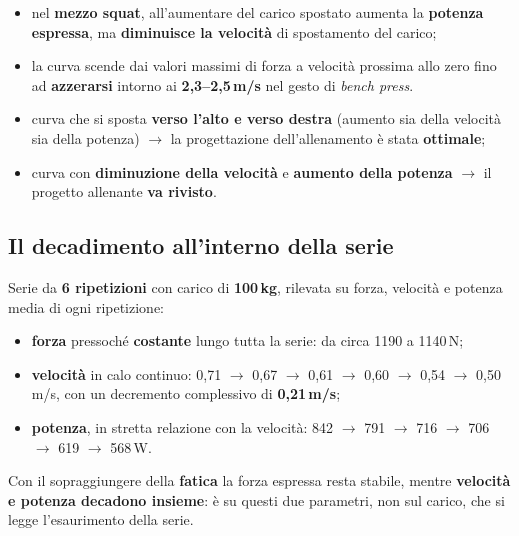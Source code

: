 \begin{itemize}
  \item nel \textbf{mezzo squat}, all'aumentare del carico spostato aumenta la \textbf{potenza
    espressa}, ma \textbf{diminuisce la velocità} di spostamento del carico;
  \item la curva scende dai valori massimi di forza a velocità prossima allo zero fino ad
    \textbf{azzerarsi} intorno ai \textbf{2,3--2,5\,m/s} nel gesto di \textit{bench press}.
\end{itemize}

\begin{itemize}
  \item curva che si sposta \textbf{verso l'alto e verso destra} (aumento sia della velocità sia
    della potenza) $\rightarrow$ la progettazione dell'allenamento è stata \textbf{ottimale};
  \item curva con \textbf{diminuzione della velocità} e \textbf{aumento della potenza}
    $\rightarrow$ il progetto allenante \textbf{va rivisto}.
\end{itemize}

\subsection{Il decadimento all'interno della serie}

Serie da \textbf{6 ripetizioni} con carico di \textbf{100\,kg}, rilevata su forza, velocità e potenza
media di ogni ripetizione:
\begin{itemize}
  \item \textbf{forza} pressoché \textbf{costante} lungo tutta la serie: da circa 1190 a 1140\,N;
  \item \textbf{velocità} in calo continuo: 0,71 $\rightarrow$ 0,67 $\rightarrow$ 0,61 $\rightarrow$
    0,60 $\rightarrow$ 0,54 $\rightarrow$ 0,50\,m/s, con un decremento complessivo di
    \textbf{0,21\,m/s};
  \item \textbf{potenza}, in stretta relazione con la velocità: 842 $\rightarrow$ 791 $\rightarrow$
    716 $\rightarrow$ 706 $\rightarrow$ 619 $\rightarrow$ 568\,W.
\end{itemize}

Con il sopraggiungere della \textbf{fatica} la forza espressa resta stabile, mentre \textbf{velocità
e potenza decadono insieme}: è su questi due parametri, non sul carico, che si legge l'esaurimento
della serie.


